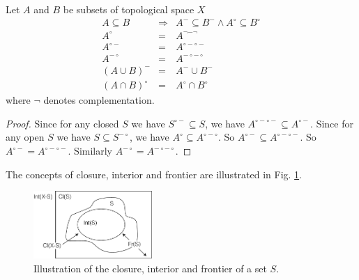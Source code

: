 \documentclass[12pt]{book}
\begin{document}
\begin{lemma}
	Let $A$ and $B$ be subsets of topological space $X$
	\begin{eqnarray}
		A\subseteq B&\Rightarrow& A^-\subseteq B^- \wedge A^\circ\subseteq B^\circ\\
		A^{\circ}&=&A^{\neg -\neg}\\
		A^{\circ-}&=&A^{\circ-\circ-}\\
		A^{-\circ}&=&A^{-\circ-\circ}\\
		(A\cup B)^-&=&A^-\cup B^-\\
		(A\cap B)^\circ&=&A^\circ\cap B^\circ
	\end{eqnarray}
	where $\neg$ denotes complementation.
\end{lemma}
\begin{proof}
	Since for any closed $S$ we have $S^{\circ-}\subseteq S$, we have $A^{\circ-\circ-}\subseteq A^{\circ-}$. Since for any open $S$ we have $S\subseteq S^{-\circ}$, we have $A^{\circ}\subseteq A^{\circ-\circ}$. So $A^{\circ-}\subseteq A^{\circ-\circ-}$. So $A^{\circ-}=A^{\circ-\circ-}$. Similarly $A^{-\circ}=A^{-\circ-\circ}$.
\end{proof}

The concepts of closure, interior and frontier are illustrated in Fig. \ref{fig:topospace1}.

\begin{figure}[htb!]
	\centering  
	\includegraphics[width=0.4\textwidth ]{resources/chap_topo_spc/topospace1.pdf}  
	\caption{Illustration of the closure, interior and frontier of a set $S$.}
	\label{fig:topospace1}
\end{figure}
\end{document}
